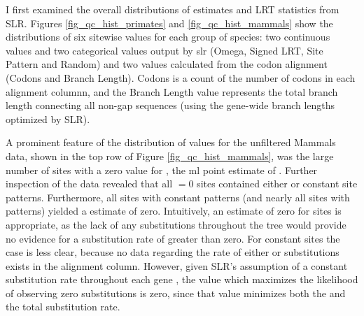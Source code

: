I first examined the overall distributions of \omg estimates and \sw
LRT statistics from SLR. Figures \ref{fig_qc_hist_primates} and
\ref{fig_qc_hist_mammals} show the distributions of six sitewise values
for each group of species: two continuous values and two categorical
values output by \ac{slr} (Omega, Signed LRT, Site Pattern and Random)
and two values calculated from the codon alignment (\Ngap Codons and
\Ngap Branch Length). \Ngap Codons is a count of the number of \ngap
codons in each alignment columnn, and the \Ngap Branch Length value
represents the total branch length connecting all non-gap sequences
(using the gene-wide branch lengths optimized by SLR).

A prominent feature of the distribution of \omg values for the
unfiltered Mammals data, shown in the top row of Figure
\ref{fig_qc_hist_mammals}, was the large number of sites with a
zero value for \omgml, the \ac{ml} point estimate of \omg. Further
inspection of the data revealed that all \omgml$=0$ sites contained
either \syn or constant site patterns. Furthermore, all sites with
constant patterns (and nearly all sites with \syn patterns) yielded a
\omgml estimate of zero. Intuitively, an estimate of zero for \syn
sites is appropriate, as the lack of any \nsyn substitutions
throughout the tree would provide no evidence for a \nsyn substitution
rate of greater than zero. For constant sites the case is less clear,
because no data regarding the rate of either \syn or \nsyn
substitutions exists in the alignment column. However, given SLR's
assumption of a constant \syn substitution rate throughout each gene
\citep{Massingham2005}, the \omg value which maximizes the likelihood
of observing zero substitutions is zero, since that value minimizes
both the \nsyn and the total substitution rate.

